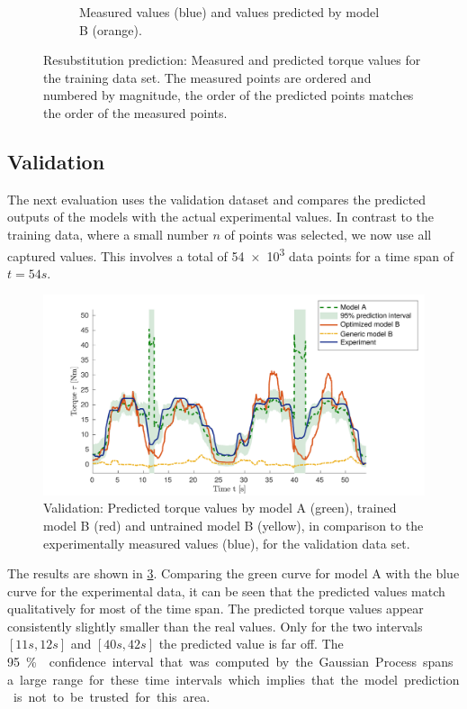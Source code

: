 \begin{figure}
\begin{subfigure}[t]{0.48\textwidth}
    \caption{Measured values (blue) and values predicted by model B (orange).}%
    \label{fig:measured_optimized_torque_B}%
  \end{subfigure}%
  \caption{Resubstitution prediction: Measured and predicted torque values for the training data set. The measured points are ordered and numbered by magnitude, the order of the predicted points matches the order of the measured points.}%
  \label{fig:measured_optimized_torque}%
\end{figure}%

\subsection{Validation}\label{sec:res_validation}

The next evaluation uses the validation dataset and compares the predicted outputs of the models with the actual experimental values.
In contrast to the training data, where a small number $n$ of points was selected, we now use all captured values. This involves a total of \num{54e3} data points for a time span of $t=\SI{54}s$. 

\begin{figure}%
  \centering%
  \includegraphics[width=\textwidth]{images/summer_school_study/validation_bv5_40_points.pdf}%
  \caption{Validation: Predicted torque values by model A (green), trained model B (red) and untrained model B (yellow), in comparison to the experimentally measured values (blue), for the validation data set.}%
  \label{fig:validation_bv5_40_points}%
\end{figure}%

The results are shown in \cref{fig:validation_bv5_40_points}. Comparing the green curve for model A with the blue curve for the experimental data, it can be seen that the predicted values match qualitatively for most of the time span. The predicted torque values appear consistently slightly smaller than the real values. Only for the two intervals $[\SI{11}s, \SI{12}s]$ and $[\SI{40}s, \SI{42}s]$ the predicted value is far off. The \SI{95}\percent{} confidence interval that was computed by the Gaussian Process spans a large range for these time intervals which implies that the model prediction is not to be trusted for this area. 

